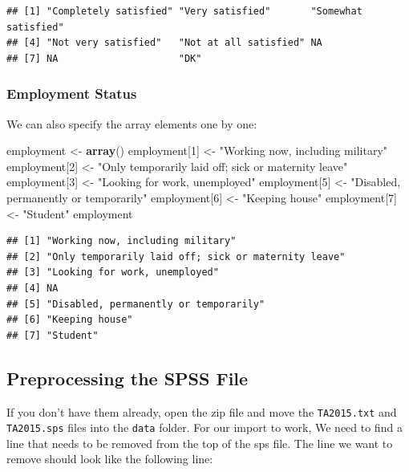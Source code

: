 \documentclass[]{book}
\newenvironment{Shaded}{\begin{snugshade}}{\end{snugshade}}
\newcommand{\KeywordTok}[1]{\textcolor[rgb]{0.13,0.29,0.53}{\textbf{{#1}}}}
\newcommand{\DecValTok}[1]{\textcolor[rgb]{0.00,0.00,0.81}{{#1}}}
\newcommand{\StringTok}[1]{\textcolor[rgb]{0.31,0.60,0.02}{{#1}}}
\newcommand{\NormalTok}[1]{{#1}}
\theoremstyle{definition}
\theoremstyle{definition}
\theoremstyle{remark}
\begin{document}
\begin{verbatim}
## [1] "Completely satisfied" "Very satisfied"       "Somewhat satisfied"  
## [4] "Not very satisfied"   "Not at all satisfied" NA                    
## [7] NA                     "DK"
\end{verbatim}

\subsubsection{Employment Status}\label{employment-status}

We can also specify the array elements one by one:

\begin{Shaded}
\begin{Highlighting}[]
\NormalTok{employment <-}\StringTok{ }\KeywordTok{array}\NormalTok{()}
\NormalTok{employment[}\DecValTok{1}\NormalTok{] <-}\StringTok{ "Working now, including military"}
\NormalTok{employment[}\DecValTok{2}\NormalTok{] <-}\StringTok{ "Only temporarily laid off; sick or maternity leave"}
\NormalTok{employment[}\DecValTok{3}\NormalTok{] <-}\StringTok{ "Looking for work, unemployed"}
\NormalTok{employment[}\DecValTok{5}\NormalTok{] <-}\StringTok{ "Disabled, permanently or temporarily"}
\NormalTok{employment[}\DecValTok{6}\NormalTok{] <-}\StringTok{ "Keeping house"}
\NormalTok{employment[}\DecValTok{7}\NormalTok{] <-}\StringTok{ "Student"}
\NormalTok{employment}
\end{Highlighting}
\end{Shaded}

\begin{verbatim}
## [1] "Working now, including military"                   
## [2] "Only temporarily laid off; sick or maternity leave"
## [3] "Looking for work, unemployed"                      
## [4] NA                                                  
## [5] "Disabled, permanently or temporarily"              
## [6] "Keeping house"                                     
## [7] "Student"
\end{verbatim}

\subsection{Preprocessing the SPSS
File}\label{preprocessing-the-spss-file}

If you don't have them already, open the zip file and move the
\texttt{TA2015.txt} and \texttt{TA2015.sps} files into the \texttt{data}
folder. For our import to work, We need to find a line that needs to be
removed from the top of the sps file. The line we want to remove should
look like the following line:
\end{document}
